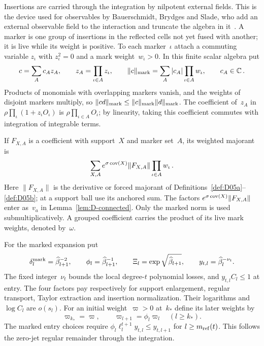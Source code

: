 Insertions are carried through the integration by nilpotent external fields. This is the device used for observables by Bauerschmidt, Brydges and Slade, who add an external observable field to the interaction and truncate the algebra in it~\cite[Section~2.3]{BauerschmidtBrydgesSlade2015}. A marker is one group of insertions in the reflected cells not yet fused with another; it is live while its weight is positive. To each marker~$\iota$ attach a commuting variable $z_\iota$ with $z_\iota^2=0$ and a mark weight~$w_\iota>0$. In this finite scalar algebra put
\begin{equation*}
c=\sum_Ac_Az_A,\qquad z_A=\prod_{\iota\in A}z_\iota,\qquad
\|c\|_{\rm mark}=\sum_A|c_A|\prod_{\iota\in A}w_\iota,
\qquad c_A\in\mathbb{C}\,.
\end{equation*}
Products of monomials with overlapping markers vanish, and the weights of disjoint markers multiply, so $\|cd\|_{\rm mark}\le\|c\|_{\rm mark}\|d\|_{\rm mark}$. The coefficient of~$z_A$ in $\rho\prod_\iota(1+z_\iota O_\iota)$ is $\rho\prod_{\iota\in A}O_\iota$; by linearity, taking this coefficient commutes with integration of integrable terms.

If $F_{X,A}$ is a coefficient with support~$X$ and marker set~$A$, its weighted majorant is
\begin{equation*}
\sum_{X,A}e^{\sigma\operatorname{cov}(X)}\|F_{X,A}\|\prod_{\iota\in A}w_\iota\,.
\end{equation*}
Here $\|F_{X,A}\|$ is the derivative or forced majorant of Definitions~\ref{def:D05a}--\ref{def:D05b}; at a support ball use its anchored sum. The factors $e^{\sigma\operatorname{cov}(X)}\|F_{X,A}\|$ enter as~$v_a$ in Lemma~\ref{lem:D-connected}. Only the marked norm is used submultiplicatively. A grouped coefficient carries the product of its live mark weights, denoted by~$\omega$.

For the marked expansion put
\begin{equation*}
\delta_l^{\rm mark}=\widehat\beta_{l+1}^{-2},\qquad
\phi_l=\widehat\beta_{l+1}^{-1},\qquad
\Xi_l=\exp\sqrt{\widehat\beta_{l+1}},\qquad
y_{t,l}=\widehat\beta_l^{-\nu_t}.
\end{equation*}
The fixed integer~$\nu_t$ bounds the local degree-$t$ polynomial losses, and $y_{t,l}C_l\le1$ at entry. The four factors pay respectively for support enlargement, regular transport, Taylor extraction and insertion normalization. Their logarithms and~$\log C_l$ are $o(s_l)$. For an initial weight~$\varpi>0$ at~$k_*$ define its later weights by
\begin{equation*}
\varpi_{k_*}=\varpi,\qquad \varpi_{l+1}=\phi_l\varpi_l\quad(l\ge k_*).
\end{equation*}
The marked entry choices require $\phi_l\ell_l^{t+1}y_{t,l}\le y_{t,l+1}$ for $l\ge m_{\mathrm{ref}}(t)$. This follows the zero-jet regular remainder through the integration.

